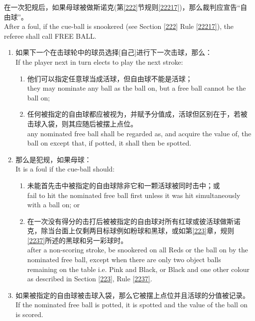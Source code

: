 \noindent 在一次犯规后，如果母球被做斯诺克(\see{}第\ref{222}节规则\ref{22217})，那么裁判应宣告“自由球”。\\
After a foul, if the cue-ball is snookered (see Section \ref{222} Rule \ref{22217}), the referee shall call FREE BALL.
\begin{enumerate}[label=(\alph*)]
    \item 如果下一个在击球轮中的球员选择[自己]进行下一次击球，那么：\\
    If the player next in turn elects to play the next stroke:
    \begin{enumerate}[label=(\roman*)]
        \item 他们可以指定任意球当成活球，但自由球不能是活球；\\
        they may nominate any ball as the ball on, but a free ball cannot be the ball on;
        \item 任何被指定的自由球都应被视为，并赋予分值成，活球但区别在于，若被击球入袋，则其应随后被摆上点位。\\
        any nominated free ball shall be regarded as, and acquire the value of, the ball on except that, if potted, it shall then be spotted.
    \end{enumerate}
    \item \label{22312b}那么是犯规，如果母球：\\
    It is a foul if the cue-ball should:
    \begin{enumerate}[label=(\roman*)]
        \item 未能首先击中被指定的自由球除非它和一颗活球被同时击中；或\\
        fail to hit the nominated free ball first unless it was hit simultaneously with a ball on; or
        \item \label{22312bii}在一次没有得分的击打后被被指定的自由球对所有红球或彼活球做斯诺克，除当台面上仅剩两目标球例如粉球和黑球，或如第\ref{223}章，规则\ref{2237}所述的黑球和另一彩球时。\\
        after a non-scoring stroke, be snookered on all Reds or the ball on by the nominated free ball, except when there are only two object balls remaining on the table i.e. Pink and Black, or Black and one other colour as described in Section \ref{223}, Rule \ref{2237}.
    \end{enumerate}
    \item 如果被指定的自由球被击球入袋，那么它被摆上点位并且活球的分值被记录。\\
    If the nominated free ball is potted, it is spotted and the value of the ball on is scored.

\end{enumerate}
